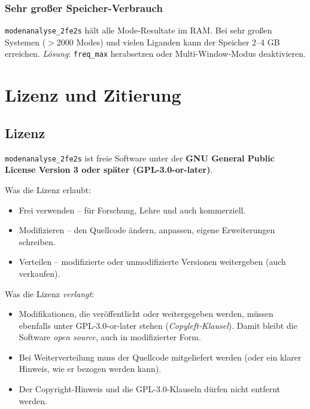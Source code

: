 \documentclass[11pt,a4paper,twoside]{article}
\theoremstyle{remark}
\begin{document}
\subsubsection*{Sehr gro\ss er Speicher-Verbrauch}

\texttt{modenanalyse\_2fe2s} h\"alt alle Mode-Resultate im RAM. Bei
sehr gro\ss en Systemen ($>$2000 Modes) und vielen Liganden kann der
Speicher 2--4 GB erreichen. \emph{L\"osung}: \texttt{freq\_max}
herabsetzen oder Multi-Window-Modus deaktivieren.



\section{Lizenz und Zitierung}
\label{sec:lizenz}

\subsection{Lizenz}

\texttt{modenanalyse\_2fe2s} ist freie Software unter der
\textbf{GNU General Public License Version 3 oder sp\"ater (GPL-3.0-or-later)}.

Was die Lizenz erlaubt:

\begin{itemize}
  \item Frei verwenden -- f\"ur Forschung, Lehre und auch kommerziell.
  \item Modifizieren -- den Quellcode \"andern, anpassen, eigene
        Erweiterungen schreiben.
  \item Verteilen -- modifizierte oder unmodifizierte Versionen
        weitergeben (auch verkaufen).
\end{itemize}

Was die Lizenz \emph{verlangt}:

\begin{itemize}
  \item Modifikationen, die ver\"offentlicht oder weitergegeben werden,
        m\"ussen ebenfalls unter GPL-3.0-or-later stehen
        (\emph{Copyleft-Klausel}). Damit bleibt die Software
        \emph{open source}, auch in modifizierter Form.
  \item Bei Weiterverteilung muss der Quellcode mitgeliefert werden
        (oder ein klarer Hinweis, wie er bezogen werden kann).
  \item Der Copyright-Hinweis und die GPL-3.0-Klauseln d\"urfen nicht
        entfernt werden.
\end{itemize}
\end{document}
